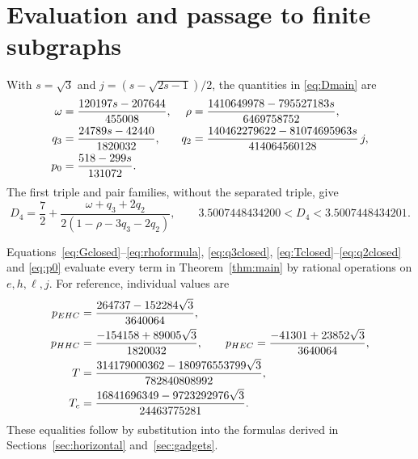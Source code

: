 \documentclass[11pt,a4paper]{article}
\theoremstyle{definition}
\theoremstyle{remark}
\begin{document}
\section{Evaluation and passage to finite subgraphs}\label{sec:counts}
With $s=\sqrt3$ and $j=(s-\sqrt{2s-1})/2$, the quantities in \eqref{eq:Dmain} are
\begin{align}\label{eq:mainconstants}
\omega&=\frac{120197s-207644}{455008},&
\rho&=\frac{1410649978-795527183s}{6469758752},\notag\\
q_3&=\frac{24789s-42440}{1820032},&
q_2&=\frac{140462279622-81074695963s}{414064560128}\,j,\\
p_0&=\frac{518-299s}{131072}.&&\notag
\end{align}
The first triple and pair families, without the separated triple, give
\begin{equation}\label{eq:Dfour}
D_4=\frac72+\frac{\omega+q_3+2q_2}{2(1-\rho-3q_3-2q_2)},\qquad
3.5007448434200<D_4<3.5007448434201.
\end{equation}

Equations~\eqref{eq:Gclosed}--\eqref{eq:rhoformula}, \eqref{eq:q3closed}, \eqref{eq:Tclosed}--\eqref{eq:q2closed} and \eqref{eq:p0} evaluate every term in Theorem~\ref{thm:main} by rational operations on $e,h,\ell,j$. For reference, individual values are
\begin{align}\label{eq:individual}
p_{EHC}&=\frac{264737-152284\sqrt3}{3640064},\notag\\
p_{HHC}&=\frac{-154158+89005\sqrt3}{1820032},\qquad
p_{HEC}=\frac{-41301+23852\sqrt3}{3640064},\\
T&=\frac{314179000362-180976553799\sqrt3}{782840808992},\notag\\
T_c&=\frac{16841696349-9723292976\sqrt3}{24463775281}.\notag
\end{align}
These equalities follow by substitution into the formulas derived in Sections~\ref{sec:horizontal} and~\ref{sec:gadgets}.
\end{document}

